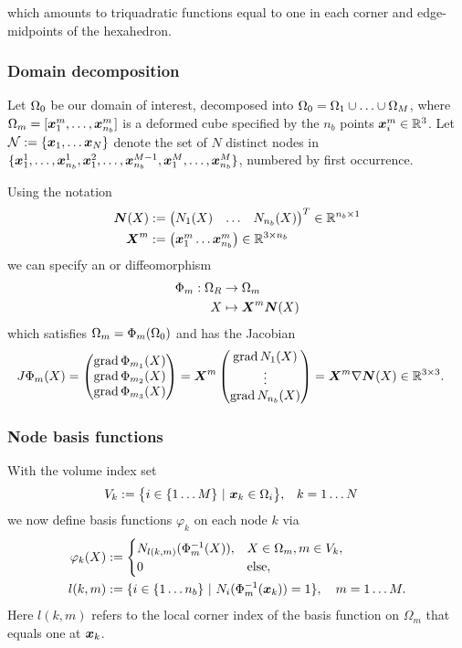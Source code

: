 which amounts to triquadratic functions equal to one in each corner and edge-midpoints of the hexahedron.

\subsubsection{Domain decomposition}
Let $\Omega_0$ be our domain of interest, decomposed into $\Omega_0 = \Omega_1\cup \ldots \cup \Omega_M$, where
$\Omega_m = [\boldsymbol{x}^m_1,\ldots,\boldsymbol{x}^m_{n_b}]$ is a deformed cube specified by the $n_b$ points $\boldsymbol{x}_i^m\in\mathbb{R}^3$.
Let $\mathcal{N} := \{\boldsymbol{x}_1,\ldots\boldsymbol{x}_N\}$ denote the set of $N$ distinct nodes in
$\{\boldsymbol{x}_1^1, \ldots, \boldsymbol{x}_{n_b}^1, \boldsymbol{x}_1^2, \ldots, \boldsymbol{x}_{n_b}^{M-1}, \boldsymbol{x}_1^M, \ldots, \boldsymbol{x}_{n_b}^M\}$, numbered by first occurrence.

Using the notation
\begin{align}
	\boldsymbol{N}(X) &:= \left(\begin{matrix}N_1(X) & \ldots & N_{n_b}(X)\end{matrix}\right)^T\in\mathbb{R}^{n_b\times 1}\\
	\boldsymbol{X}^m &:= \left(\begin{matrix}\boldsymbol{x}^m_1 \ldots \boldsymbol{x}^m_{n_b}\end{matrix}\right) \in\mathbb{R}^{3\times n_b}
\end{align}
 we can specify an  or diffeomorphism
\begin{align}
	\Phi_m : \Omega_R &\to \Omega_m\\
	X &\mapsto \boldsymbol{X}^m\boldsymbol{N}(X)
\end{align}
which satisfies $\Omega_m = \Phi_m(\Omega_0)$ and has the Jacobian
\begin{align}
	J\Phi_m(X) &= \left(\begin{matrix}\operatorname{grad} \Phi_{m_1}(X)\\\operatorname{grad} \Phi_{m_2}(X)\\\operatorname{grad} \Phi_{m_3}(X)\\\end{matrix}\right) 
	= \boldsymbol{X}^m\left(\begin{matrix}\operatorname{grad} N_1(X)\\ \vdots\\\operatorname{grad} N_{n_b}(X)\end{matrix}\right) = \boldsymbol{X}^m\nabla\boldsymbol{N}(X) \in \mathbb{R}^{3\times 3}.\label{def:refbasis_jacobian}
\end{align}

\subsubsection{Node basis functions}
With the volume index set
\begin{align}
	V_k &:= \bigl\{i\in\{1\ldots M\}~|~ \boldsymbol{x}_k\in\Omega_i\bigr\},&&k=1\ldots N
\end{align}
we now define basis functions $\varphi_k$ on each node $k$ via
\begin{align}
	\varphi_k(X) &:= \begin{cases}
		N_{l(k,m)}(\Phi^{-1}_m(X)), & X\in\Omega_m, m\in V_k,\\
		0 & \text{else},	
	\end{cases}\label{def:referencebasisfun}\\
	l(k,m) &:= \{i\in\{1\ldots n_b\}~|~ N_i(\Phi_m^{-1}(\boldsymbol{x}_k))=1\},\quad m=1\ldots M.
\end{align}
Here $l(k,m)$ refers to the local corner index of the basis function on $\Omega_m$ that equals one at $\boldsymbol{x}_k$.


